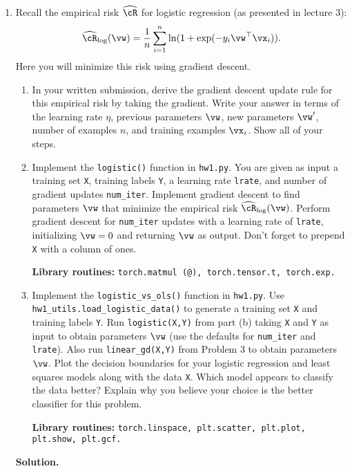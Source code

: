 \documentclass{article}
\def\hcR{\widehat{\cR}}
\theoremstyle{definition}
\theoremstyle{remark}
\newenvironment{Q}
{%
  \clearpage
  \item
  }
  {%
    \phantom{s} %
    \bigskip
    \textbf{Solution.}
  }
\begin{document}
\begin{enumerate}[font={\Large\bfseries},left=0pt]
\begin{Q}
  Recall the empirical risk $\hcR$ for logistic regression (as presented in lecture 3):
  \begin{align*}
  \hcR_{\log}(\vw) = \frac{1}{n} \sum_{i=1}^n \ln ( 1 + \exp( - y_i \vw^\top \vx_i ) ).
  \end{align*}
  Here you will minimize this risk using gradient descent.
  \begin{enumerate}
  \item In your written submission, derive the gradient descent update rule for this empirical risk by taking the gradient.  Write your answer in terms of the learning rate $\eta$, previous parameters $\vw$, new parameters $\vw'$, number of examples $n$, and training examples $\vx_i$.  Show all of your steps.
  \item Implement the \texttt{logistic()} function in \texttt{hw1.py}.  You are given as input a training set \texttt{X}, training labels \texttt{Y}, a learning rate \texttt{lrate}, and number of gradient updates \texttt{num\_iter}.  Implement gradient descent to find parameters $\vw$ that minimize the empirical risk $\hcR_{\log}(\vw)$. Perform gradient descent for \texttt{num\_iter} updates with a learning rate of \texttt{lrate}, initializing $\vw = 0$ and returning $\vw$ as output. Don't forget to prepend \texttt{X} with a column of ones.
  
  \textbf{Library routines:} \texttt{torch.matmul (@), torch.tensor.t, torch.exp.}
  
  \item Implement the \texttt{logistic\_vs\_ols()} function in \texttt{hw1.py}. Use \texttt{hw1\_utils.load\_logistic\_data()} to generate a training set \texttt{X} and training labels \texttt{Y}.  Run \texttt{logistic(X,Y)} from part (b) taking \texttt{X} and \texttt{Y} as input to obtain parameters $\vw$ (use the defaults for \texttt{num\_iter} and \texttt{lrate}).  Also run \texttt{linear\_gd(X,Y)} from Problem 3 to obtain parameters $\vw$.  Plot the decision boundaries for your logistic regression and least squares models along with the data \texttt{X}. Which model appears to classify the data better? Explain why you believe your choice is the better classifier for this problem.
  
  \textbf{Library routines:} \texttt{torch.linspace, plt.scatter, plt.plot, plt.show, plt.gcf.}
  

\end{enumerate}
\end{Q}
\end{enumerate}
\end{document}
